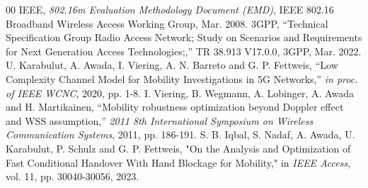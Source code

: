 \documentclass[10pt, conference]{IEEEtran}
\begin{document}
\begin{thebibliography}{00}
 IEEE, \textit{802.16m Evaluation Methodology Document (EMD)}, IEEE 802.16 Broadband Wireless Access Working Group, Mar. 2008.
 3GPP, “Technical Specification Group Radio Access Network; Study on Scenarios and Requirements for Next Generation Access Technologies;,” TR 38.913 V17.0.0, 3GPP, Mar. 2022.
  U. Karabulut, A. Awada, I. Viering, A. N. Barreto and G. P. Fettweis, “Low Complexity Channel Model for Mobility Investigations in 5G Networks,” \textit{ in proc. of IEEE WCNC}, 2020, pp. 1-8.
 I. Viering, B. Wegmann, A. Lobinger, A. Awada and H. Martikainen, “Mobility robustness optimization beyond Doppler effect and WSS assumption,” \textit{2011 8th International Symposium on Wireless Communication Systems}, 2011, pp. 186-191.
 S. B. Iqbal, S. Nadaf, A. Awada, U. Karabulut, P. Schulz and G. P. Fettweis, "On the Analysis and Optimization of Fast Conditional Handover With Hand Blockage for Mobility," in \textit{IEEE Access}, vol. 11, pp. 30040-30056, 2023.

\end{thebibliography}
\end{document}
